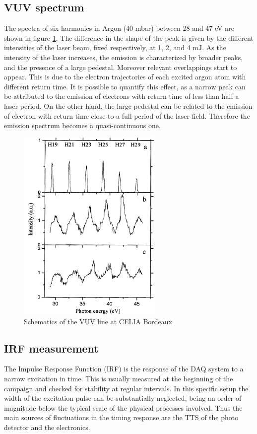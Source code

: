 \subsection{VUV spectrum}
The spectra of six harmonics in Argon (40 mbar) between 28 and 47 eV are shown in figure \ref{fig:VUV_spectrum}.
The difference in the shape of the peak is given by the different intensities of the laser beam, fixed respectively, at 1, 2, and 4 mJ.
As the intensity of the laser increases, the emission is characterized by broader peaks, and the presence of a large pedestal.
Moreover relevant overlappings start to appear.
This is due to the electron trajectories of each excited argon atom with different return time.
It is possible to quantify this effect, as a narrow peak can be attributed to the emission of electrons with return time of less than half a laser period.
On the other hand, the large pedestal can be related to the emission of electron with return
time close to a full period of the laser field.
Therefore the emission spectrum becomes a quasi-continuous one.

\begin{figure}[htbp]
\begin{center}
\includegraphics[width=7cm]{../Pictures/Chapter_7/VUV_spectrum.png}
\end{center}
\caption[VUV spectrum]{Schematics of the VUV line at CELIA Bordeaux \cite{Martin2001}}
\label{fig:VUV_spectrum}
\end{figure}

\subsection{IRF measurement}
The Impulse Response Function (IRF) is the response of the DAQ system to a narrow excitation in time. This is usually measured at the beginning of the campaign and checked for stability at regular intervals.
In this specific setup the width of the excitation pulse can be substantially neglected, being an order of magnitude below the typical scale of the physical processes involved. Thus the main sources of fluctuations in the timing response are the TTS of the photo detector and the electronics.

